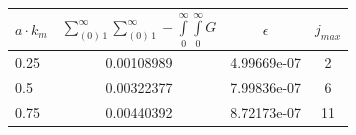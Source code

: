 \documentclass[twoside, 10pt, ptm]{article}
\begin{document}
\begin{multicols}{2}
\begin{center}
\begin{tabular}{ | l | c | c | c | }
\hline
$a \cdot k_m$ & $\sum\limits_{\left(0\right)\,1}^{\infty}\sum\limits_{\left(0\right)\,1}^{\infty}-\int\limits_{0}^{\infty}\int\limits_{0}^{\infty}G$ & $\epsilon$ & $j_{max}$ \\
\hline
0.25 & 0.00108989 & 4.99669e-07 & 2 \\
0.5 & 0.00322377 & 7.99836e-07 & 6 \\
0.75 & 0.00440392 & 8.72173e-07 & 11 \\




\end{tabular}
\end{center}
\end{multicols}
\end{document}
